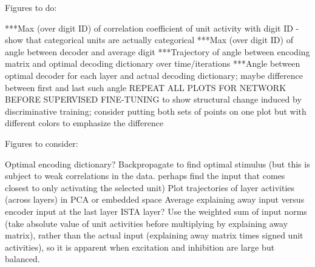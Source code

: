 

Figures to do:


***Max (over digit ID) of correlation coefficient of unit activity with digit ID - show that categorical units are actually categorical
***Max (over digit ID) of angle between decoder and average digit
***Trajectory of angle between encoding matrix and optimal decoding dictionary over time/iterations
***Angle between optimal decoder for each layer and actual decoding dictionary; maybe difference between first and last such angle
REPEAT ALL PLOTS FOR NETWORK BEFORE SUPERVISED FINE-TUNING to show structural change induced by discriminative training; consider putting both sets of points on one plot but with different colors to emphasize the difference


Figures to consider:

Optimal encoding dictionary?
Backpropagate to find optimal stimulus (but this is subject to weak correlations in the data.  perhaps find the input that comes closest to only activating the selected unit)
Plot trajectories of layer activities (across layers) in PCA or embedded space
Average explaining away input versus encoder input at the last layer ISTA layer?  Use the weighted sum of input norms (take absolute value of unit activities before multiplying by explaining away matrix), rather than the actual input (explaining away matrix times signed unit activities), so it is apparent when excitation and inhibition are large but balanced.

